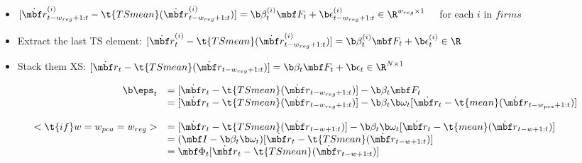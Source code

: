 \documentclass[12pt,article]{memoir}
\begin{document}
\begin{itemize}
  \item $[\dot{\mbf r}^{(i)}_{t-w_{reg}+1:t} - \t{TSmean}(\dot{\mbf r}^{(i)}_{t-w_{reg}+1:t})] = \b \beta_t^{(i)} \mbf F_t + \b \epsilon^{(i)}_{t-w_{reg}+1:t}\in \R^{w_{reg}\times 1}$ ~~for each $i$ in $firms$
  \item Extract the last TS element: $[\dot{\mbf r}^{(i)}_{t} - \t{TSmean}(\dot{\mbf r}^{(i)}_{t-w_{reg}+1:t})] = \b \beta_t^{(i)} \mbf F_t + \b \epsilon^{(i)}_{t}\in \R$
  \item Stack them XS: $[\dot{\mbf r}_{t} - \t{TSmean}(\dot{\mbf r}_{t-w_{reg}+1:t})] = \b \beta_t \mbf F_t + \b \epsilon_{t}\in \R^{N\times 1}$
\end{itemize}

$$\begin{array}{rl}
\b \eps_t 
&= [\dot{\mbf r}_{t} - \t{TSmean}(\dot{\mbf r}_{t-w_{reg}+1:t})] -  \b \beta_t \mbf F_t
\\
&= [\dot{\mbf r}_{t} - \t{TSmean}(\dot{\mbf r}_{t-w_{reg}+1:t})] -  \b \beta_t \b \omega_t [\dot{\mbf r_t} - \t{mean}(\dot{\mbf r}_{t-w_{pca}+1:t})]
\\ \\  < \t{if }w= w_{pca}=w_{reg}> 
&=
[\dot{\mbf r}_{t} - \t{TSmean}(\dot{\mbf r}_{t-w+1:t})] -  \b \beta_t \b \omega_t [\dot{\mbf r_t} - \t{mean}(\dot{\mbf r}_{t-w+1:t})]
\\ &=
(\mbf I - \b \beta_t \b \omega_t )[\dot{\mbf r}_{t} - \t{TSmean}(\dot{\mbf r}_{t-w+1:t})] 
\\ &=
\mbf  \Phi_t [\dot{\mbf r}_{t} - \t{TSmean}(\dot{\mbf r}_{t-w+1:t})] 
\end{array}$$
 
 
\Vhrulefill
\end{document}
